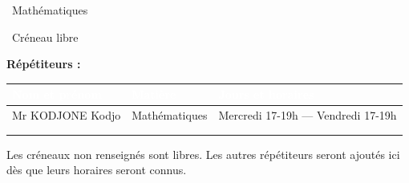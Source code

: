 \documentclass[a4paper,landscape,10pt]{article}
\newcommand{\legende}[2]{%
  \colorbox{#1}{\rule[-1.5pt]{0pt}{10pt}\hspace{1.1cm}}~{\footnotesize #2}}
\begin{document}
\noindent
\legende{cMathematiques}{Mathématiques} \quad \legende{libre}{Créneau libre}

\vspace{8pt}
\noindent\textbf{Répétiteurs :}
\vspace{3pt}

\noindent
\begin{tabular}{|p{6.0cm}|p{4.5cm}|p{12.0cm}|}
\hline
\rowcolor{entete}\textcolor{white}{\textbf{Nom et prénom}} & \textcolor{white}{\textbf{Matière}} & \textcolor{white}{\textbf{Jours et horaires}} \\
\hline
Mr KODJONE Kodjo & Mathématiques & Mercredi 17-19h — Vendredi 17-19h \\[6pt]
\hline
 &  &  \\[6pt]
\hline
 &  &  \\[6pt]
\hline
\end{tabular}

\vspace{6pt}
\noindent\textcolor{note}{\footnotesize
Les créneaux non renseignés sont libres. Les autres répétiteurs seront ajoutés ici dès que leurs horaires seront connus.
}
\end{document}
